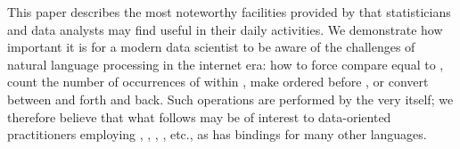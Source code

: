 \documentclass[nojss]{jss}\usepackage[]{graphicx}\usepackage[]{xcolor}
\begin{document}
\bigskip
This paper describes the most noteworthy facilities provided by
 that statisticians and data analysts may find
useful in their daily activities. We demonstrate how important it is
for a modern data scientist to be aware of the challenges
of natural language processing in the internet era:
how to force  compare equal to ,
count the number of occurrences of  within
,
make  ordered before , or
convert between  and  forth and back.
Such operations are performed by the very  itself;
we therefore believe that what follows may be of interest
to data-oriented practitioners employing ,
, , , etc.,
as  has bindings for many other languages.
\end{document}

